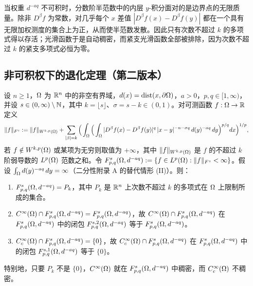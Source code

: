 \begin{remark}[直觉]
当权重 $d^{-aq}$ 不可积时，分数阶半范数中的内层 $y$-积分面对的是边界点的无限质量。除非 $D^\beta f$ 为常数，对几乎每个 $x$ 差值 $|D^\beta f(x)-D^\beta f(y)|$ 都在一个具有无限加权测度的集合上为正，从而使半范数发散。因此只有次数不超过 $k$ 的多项式得以存活；光滑函数于是自动稠密，而紧支光滑函数全部被排除，因为次数不超过 $k$ 的紧支多项式必恒为零。
\end{remark}

\subsection{非可积权下的退化定理（第二版本）}

\begin{theorem}[不可积权情形下的退化定理]
设 $n\ge 1$，$\Omega$ 为 $\mathbb{R}^n$ 中的非空有界域，$d(x)=\operatorname{dist}(x,\partial\Omega)$，$a>0$，$p,q\in[1,\infty)$，并设 $s\in(0,\infty)\setminus\mathbb{N}$，其中 $k=\lfloor s\rfloor$、$\sigma=s-k\in(0,1)$。对可测函数 $f:\Omega\to\mathbb{R}$ 定义
\[
  \|f\|_{F^s}:=\|f\|_{W^{k,p}(\Omega)}
  +\sum_{|\beta|=k}\Big(\int_\Omega\Big(\int_\Omega |D^\beta f(x)-D^\beta f(y)|^q\,|x-y|^{-n-\sigma q}\,d(y)^{-aq}\,dy\Big)^{p/q}dx\Big)^{1/p},
\]
若 $f\notin W^{k,p}(\Omega)$ 或某项为无穷则取值为 $+\infty$，其中 $\|f\|_{W^{k,p}(\Omega)}$ 是 $f$ 的不超过 $k$ 阶弱导数的 $L^p(\Omega)$ 范数之和。令 $F^{s}_{p,q}(\Omega,d^{-aq}):=\{f\in L^p(\Omega) : \|f\|_{F^s}<\infty\}$。假设 $\int_\Omega d(y)^{-aq}\,dy=\infty$（二分性附录 A 的替代情形 (II)）。则：
\begin{enumerate}[label=(\roman*)]
\item $F^{s}_{p,q}(\Omega,d^{-aq})=P_k$，其中 $P_k$ 是 $\mathbb{R}^n$ 上次数不超过 $k$ 的多项式在 $\Omega$ 上限制所成的集合。
\item $C^\infty(\Omega)\cap F^{s}_{p,q}(\Omega,d^{-aq})=F^{s}_{p,q}(\Omega,d^{-aq})$，故 $C^\infty(\Omega)\cap F^{s}_{p,q}(\Omega,d^{-aq})$ 在 $F^{s}_{p,q}(\Omega,d^{-aq})$ 中的闭包 $F^{s,2}_{p,q}(\Omega,d^{-aq})$ 等于 $F^{s}_{p,q}(\Omega,d^{-aq})$。
\item $C_c^\infty(\Omega)\cap F^{s}_{p,q}(\Omega,d^{-aq})=\{0\}$，故 $C_c^\infty(\Omega)\cap F^{s}_{p,q}(\Omega,d^{-aq})$ 在 $F^{s}_{p,q}(\Omega,d^{-aq})$ 中的闭包 $F^{s,1}_{p,q}(\Omega,d^{-aq})$ 等于 $\{0\}$。
\end{enumerate}
特别地，只要 $P_k$ 不是 $\{0\}$，$C^\infty(\Omega)$ 就在 $F^{s}_{p,q}(\Omega,d^{-aq})$ 中稠密，而 $C_c^\infty(\Omega)$ 不稠密。
\end{theorem}

